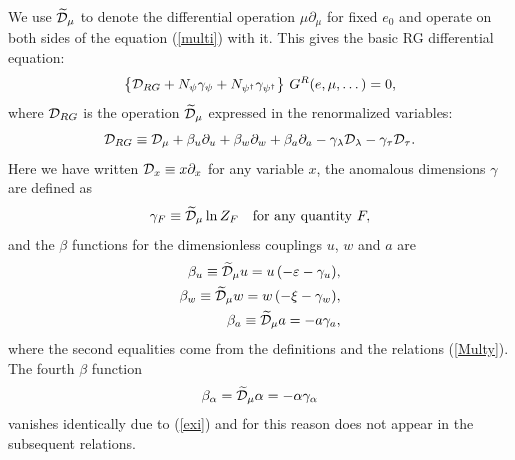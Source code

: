\documentclass[12pt]{article}
\def\Dm{\widetilde{\cal D}_{\mu}}
\begin{document}
We use $\widetilde{\cal D}_{\mu}$ to denote the differential operation
$\mu\partial_{\mu}$ for fixed $e_{0}$ and operate on both sides of the
equation (\ref{multi}) with it. This gives the basic RG differential
equation:
\begin{equation}
\left\{ {\cal D}_{RG} + N_{\psi} \gamma_{\psi} +
N_{\psi^{\dag}} \gamma_{\psi^{\dag}} \right\}
\,G^{R}(e,\mu,\dots) = 0,
\label{RG1}
\end{equation}
where ${\cal D}_{RG}$ is the operation $\widetilde{\cal D}_{\mu}$
expressed in the renormalized variables:
\begin{equation}
{\cal D}_{RG}\equiv {\cal D}_{\mu} + \beta_{u}\partial_{u} +
\beta_{w}\partial_{w}  + \beta_{a}\partial_{a} -
\gamma_{\lambda}{\cal D}_{\lambda} - \gamma_{\tau}{\cal D}_{\tau}.
\label{RG2}
\end{equation}
Here we have written ${\cal D}_{x}\equiv x\partial_{x}$ for any variable
$x$, the anomalous dimensions $\gamma$ are defined as
\begin{equation}
\gamma_{F}\equiv \Dm \ln Z_{F} \quad {\rm for\ any\ quantity} \ F,
\label{RGF1}
\end{equation}
and the $\beta$ functions for the dimensionless couplings $u$, $w$ and
$a$ are
\begin{eqnarray}
\beta_{u} \equiv \widetilde {\cal D}_{\mu} u = u\, (-\varepsilon-\gamma_{u}),
\nonumber \\
\beta_{w} \equiv \widetilde {\cal D}_{\mu} w = w\,(-\xi-\gamma_{w}),
\nonumber \\
\beta_{a} \equiv \widetilde {\cal D}_{\mu} a = -a\gamma_{a},
\label{betagw}
\end{eqnarray}
where the second equalities come from the definitions and the
relations (\ref{Multy}). The fourth $\beta$ function
\begin{eqnarray}
\beta_{\alpha}=\widetilde{\cal D}_{\mu}\alpha=-\alpha\gamma_{\alpha}
\label{Bal}
\end{eqnarray}
vanishes identically due to (\ref{exi}) and for this reason does not
appear in the subsequent relations.
\end{document}

